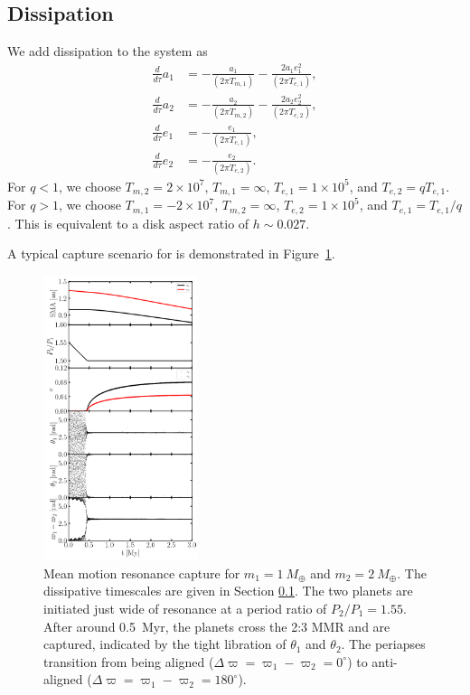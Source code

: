 \documentclass[usenatbib,twocolumn]{mnras}
\begin{document}
\subsection{Dissipation}\label{sec:cm-dis}
We add dissipation to the system as
\begin{align}
 \frac{d}{d\tau} a_1&=- \frac{a_{1}}{(2\pi T_{m,1})} - \frac{2 a_{1} e_{1}^{2}}{(2\pi T_{e,1})},\\
 \frac{d}{d\tau} a_2&=- \frac{a_{2}}{(2\pi T_{m,2})} - \frac{2 a_{2} e_{2}^{2}}{(2\pi T_{e,2})},\\
 \frac{d}{d\tau} e_1&=- \frac{e_{1}}{(2\pi T_{e,1})},\\
 \frac{d}{d\tau} e_2&=- \frac{e_{2}}{(2\pi T_{e,2})}.
\end{align}
For $q<1$, we choose $T_{m,2}=2\times10^7$, $T_{m,1}=\infty$, $T_{e,1}=1\times10^5$, and $T_{e,2}=qT_{e,1}$.
For $q>1$, we choose $T_{m,1}=-2\times10^7$, $T_{m,2}=\infty$, $T_{e,2}=1\times10^5$, and $T_{e,1}=T_{e,1}/q$.
This is equivalent to a disk aspect ratio of $h\sim 0.027$.

A typical capture scenario for is demonstrated in Figure~\ref{fig:cm-control}.

\begin{figure}
    \includegraphics[width=0.4\textwidth]{cm_0_0.png}
\caption{Mean motion resonance capture for $m_1=1~M_\oplus$ and $m_2=2~M_\oplus$. The dissipative timescales are given in Section \ref{sec:cm-dis}. The two planets are initiated just wide of resonance at a period ratio of $P_2/P_1=1.55$. After around 0.5~Myr, the planets cross the 2:3 MMR and are captured, indicated by the tight libration of $\theta_1$ and $\theta_2$. The periapses transition from being aligned ($\Delta\varpi=\varpi_1-\varpi_2=0^\circ$) to anti-aligned ($\Delta\varpi=\varpi_1-\varpi_2=180^\circ$).}
    \label{fig:cm-control}
\end{figure}
\end{document}
